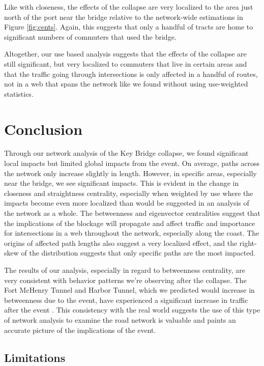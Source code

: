 \documentclass[11pt]{article}
\numberwithin{equation}{section} %
\numberwithin{figure}{section} %
\numberwithin{table}{section} %
\theoremstyle{definition}
\begin{document}
Like with closeness, the effects of the collapse are very localized to the area just north of the port near the bridge relative to the network-wide estimations in Figure \ref{fig:cents}. Again, this suggests that only a handful of tracts are home to significant numbers of commuters that used the bridge.

Altogether, our use based analysis suggests that the effects of the collapse are still significant, but very localized to commuters that live in certain areas and that the traffic going through intersections is only affected in a handful of routes, not in a web that spans the network like we found without using use-weighted statistics.


\section{Conclusion} \label{sec:concl}

Through our network analysis of the Key Bridge collapse, we found significant local impacts but limited global impacts from the event. On average, paths across the network only increase slightly in length. However, in specific areas, especially near the bridge, we see significant impacts. This is evident in the change in closeness and straightness centrality, especially when weighted by use where the impacts become even more localized than would be suggested in an analysis of the network as a whole. The betweenness and eigenvector centralities suggest that the implications of the blockage will propagate and affect traffic and importance for intersections in a web throughout the network, especially along the coast. The origins of affected path lengths also suggest a very localized effect, and the right-skew of the distribution suggests that only specific paths are the most impacted.

The results of our analysis, especially in regard to betweenness centrality, are very consistent with behavior patterns we're observing after the collapse. The Fort McHenry Tunnel and Harbor Tunnel, which we predicted would increase in betweenness due to the event, have experienced a significant increase in traffic after the event \parencite{Domen24}. This consistency with the real world suggests the use of this type of network analysis to examine the road network is valuable and paints an accurate picture of the implications of the event.


\subsection{Limitations}
\end{document}
